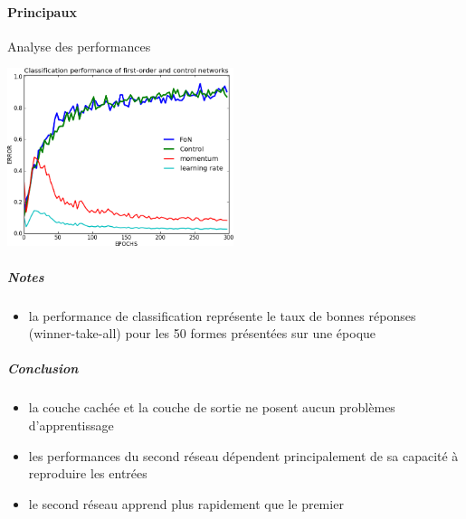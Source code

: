     \paragraph{Principaux}
      Analyse des performances
      \begin{center}
	\includegraphics[width=250px]{data/expD3/perff.png}
      \end{center}
      \subparagraph{Notes}
	\begin{itemize}
	  \item la performance de classification représente le taux de bonnes réponses (winner-take-all) pour les 50 formes présentées sur une époque
	\end{itemize}
      \subparagraph{Conclusion}
	\begin{itemize}
	  \item la couche cachée et la couche de sortie ne posent aucun problèmes d'apprentissage
	  \item les performances du second réseau dépendent principalement de sa capacité à reproduire les entrées
	  \item le second réseau apprend plus rapidement que le premier
	\end{itemize}
